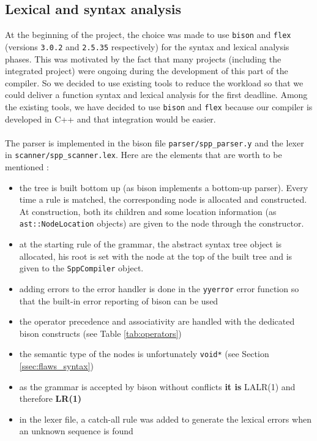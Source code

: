 \documentclass[a4paper,11pt]{article}
\begin{document}
\subsection{Lexical and syntax analysis}
\label{ssec:lex_synt}
At the beginning of the project, the choice was made to use \texttt{bison} and \texttt{flex} (versions \texttt{3.0.2} and \texttt{2.5.35} respectively) for the syntax and lexical analysis phases. This was motivated by the fact that many projects (including the integrated project) were ongoing during the development of this part of the compiler. So we decided to use existing tools to reduce the workload so that we could deliver a function syntax and lexical analysis for the first deadline. Among the existing tools, we have decided to use \texttt{bison} and \texttt{flex} because our compiler is developed in C++ and that integration would be easier.
\\ \\
The parser is implemented in the bison file \texttt{parser/spp\_parser.y} and the lexer in \texttt{scanner/spp\_scanner.lex}. Here are the elements that are worth to be mentioned :
\begin{itemize}
	\item the tree is built bottom up (as bison implements a bottom-up parser). Every time a rule is matched, the corresponding node is allocated and constructed. At construction, both its children and some location information (as \texttt{ast::NodeLocation} objects) are given to the node through the constructor.
	\item at the starting rule of the grammar, the abstract syntax tree object is allocated, his root is set with the node at the top of the built tree and is given to the \texttt{SppCompiler} object.
	\item adding errors to the error handler is done in the \texttt{yyerror} error function so that the built-in error reporting of bison can be used
	\item the operator precedence and associativity are handled with the dedicated bison constructs (see Table \ref{tab:operators})
	\item the semantic type of the nodes is unfortunately \texttt{void*} (see Section \ref{ssec:flaws_syntax})
	\item as the grammar is accepted by bison without conflicts \textbf{it is} LALR(1) and therefore \textbf{LR(1)}
	\item in the lexer file, a catch-all rule was added to generate the lexical errors when an unknown sequence is found
\end{itemize}
\end{document}
